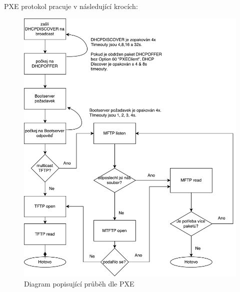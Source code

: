 \documentclass[thesis=B,czech]{FITthesis}[2012/06/26]
\begin{document}
PXE protokol pracuje v následující krocích:

\begin{figure}[h]\centering
\includegraphics[width=1\textwidth]{files/pxe-flow.pdf}
	\caption{Diagram popisující průběh dle PXE}\label{fig:float}
\end{figure}
\end{document}
